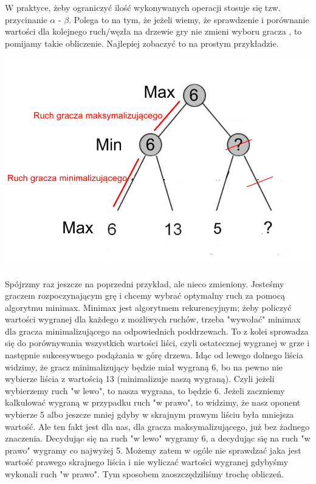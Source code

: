 \documentclass[licencjacka]{pracamgr}
\begin{document}
W praktyce, żeby ograniczyć ilość wykonywanych operacji stosuje się tzw. przycinanie  $\alpha$ - $\beta$. Polega to na tym, że jeżeli wiemy, że sprawdzenie i porównanie wartości dla kolejnego ruch/węzła na drzewie gry nie zmieni wyboru gracza , to pomijamy takie obliczenie. Najlepiej zobaczyć to na prostym przykładzie. 
\begin{center}
	\includegraphics [scale=0.3] {advertise2.png}
\end{center}
Spójrzmy raz jeszcze na poprzedni przykład, ale nieco zmieniony. Jesteśmy graczem rozpoczynającym grę i chcemy wybrać optymalny ruch za pomocą algorytmu minimax. Minimax jest algorytmem rekurencyjnym; żeby policzyć wartości wygranej dla każdego z możliwych ruchów, trzeba "wywołać" minimax dla gracza minimalizującego na odpowiednich poddrzewach. To z kolei sprowadza się do porównywania wszystkich wartości liści, czyli ostatecznej wygranej w grze i następnie sukcesywnego podążania w górę drzewa.  Idąc od lewego dolnego liścia widzimy, że gracz minimalizujący będzie miał wygraną 6, bo  na pewno nie wybierze liścia z wartością 13 (minimalizuje naszą wygraną). Czyli jeżeli wybierzemy ruch "w lewo", to nasza wygrana, to będzie 6. Jeżeli zaczniemy kalkulować wygraną w przypadku ruch "w prawo", to widzimy, że nasz oponent wybierze 5 albo jeszcze mniej gdyby w skrajnym prawym liściu była mniejsza wartość. Ale ten fakt jest dla nas, dla gracza maksymalizującego, już bez żadnego znaczenia. Decydując się na ruch "w lewo" wygramy 6, a decydując się na ruch "w prawo" wygramy co najwyżej 5. Możemy zatem w ogóle nie sprawdzać jaka jest wartość prawego skrajnego liścia i nie wyliczać wartości wygranej gdybyśmy wykonali ruch "w prawo". Tym sposobem zaoszczędziliśmy trochę obliczeń. 
\end{document}
